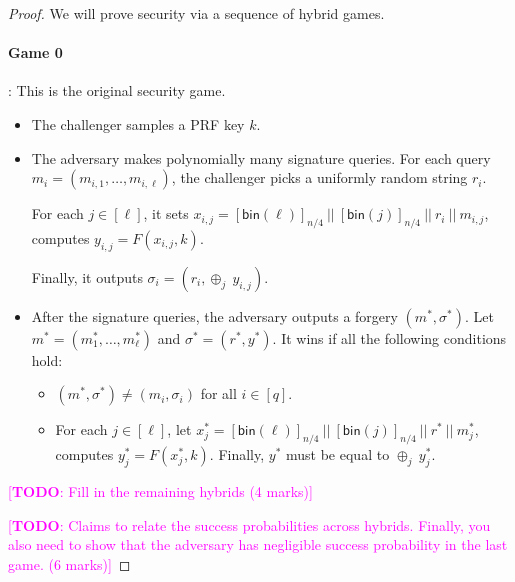 \documentclass[10pt,addpoints]{exam}
\newcommand{\TODO}[1]{\textcolor{magenta}{[\textbf{TODO}: #1]}}
\newcommand{\bin}{\mathsf{bin}}
\theoremstyle{definition}
\begin{document}
    \begin{proof}

        We will prove security via a sequence of hybrid games. 


        \paragraph{Game 0}: This is the original security game. 

        \begin{itemize}
            \item The challenger samples a PRF key $k$. 

            \item The adversary makes polynomially many signature queries. For each query $m_i = (m_{i,1}, \ldots, m_{i,\ell})$, the challenger picks a uniformly random string $r_i$. 

            For each $j \in [\ell]$, it sets $x_{i,j} = [\bin(\ell)]_{n/4} ~||~ [\bin(j)]_{n/4} ~||~  r_i ~||~ m_{i,j}$, computes $y_{i,j} = F(x_{i,j}, k)$. 

            Finally, it outputs $\sigma_i = (r_i, \oplus_j ~ y_{i,j})$. 

            \item After the signature queries, the adversary outputs a forgery $(m^*, \sigma^*)$. Let $m^* = (m^*_1, \ldots, m^*_{\ell})$ and $\sigma^* = (r^*, y^*)$. It wins if all the following conditions hold:
            \begin{itemize}
                \item $(m^*, \sigma^*) \neq (m_i, \sigma_i)$ for all $i \in [q]$. 
                \item For each $j \in [\ell]$, let $x^*_{j} = [\bin(\ell)]_{n/4} ~||~ [\bin(j)]_{n/4} ~||~  r^* ~||~ m^*_{j}$, computes $y^*_{j} = F(x^*_{j}, k)$. Finally, $y^*$ must be equal to $\oplus_j ~ y^*_{j}$. 

            \end{itemize}
        \end{itemize}


        \TODO{Fill in the remaining hybrids (4 marks)}


        \vspace{20pt}

        \TODO{Claims to relate the success probabilities across hybrids. Finally, you also need to show that the adversary has negligible success probability in the last game. (6 marks)}

    \end{proof}
\end{document}
